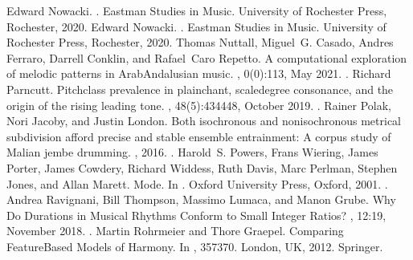 \documentclass[letterpaper,10pt,english]{sphinxmanual}
\begin{document}
\begin{sphinxthebibliography}{10}
\sphinxAtStartPar
Edward Nowacki. . Eastman Studies in Music. University of Rochester Press, Rochester, 2020.
\sphinxAtStartPar
Edward Nowacki. . Eastman Studies in Music. University of Rochester Press, Rochester, 2020.
\sphinxAtStartPar
Thomas Nuttall, Miguel G. Casado, Andres Ferraro, Darrell Conklin, and Rafael Caro Repetto. A computational exploration of melodic patterns in Arab\sphinxhyphen{}Andalusian music. , 0(0):1\textendash{}13, May 2021. .
\sphinxAtStartPar
Richard Parncutt. Pitch\sphinxhyphen{}class prevalence in plainchant, scale\sphinxhyphen{}degree consonance, and the origin of the rising leading tone. , 48(5):434\textendash{}448, October 2019. .
\sphinxAtStartPar
Rainer Polak, Nori Jacoby, and Justin London. Both isochronous and non\sphinxhyphen{}isochronous metrical subdivision afford precise and stable ensemble entrainment: A corpus study of Malian jembe drumming. , 2016. .
\sphinxAtStartPar
Harold S. Powers, Frans Wiering, James Porter, James Cowdery, Richard Widdess, Ruth Davis, Marc Perlman, Stephen Jones, and Allan Marett. Mode. In . Oxford University Press, Oxford, 2001. .
\sphinxAtStartPar
Andrea Ravignani, Bill Thompson, Massimo Lumaca, and Manon Grube. Why Do Durations in Musical Rhythms Conform to Small Integer Ratios? , 12:1\textendash{}9, November 2018. .
\sphinxAtStartPar
Martin Rohrmeier and Thore Graepel. Comparing Feature\sphinxhyphen{}Based Models of Harmony. In , 357\textendash{}370. London, UK, 2012. Springer.

\end{sphinxthebibliography}
\end{document}
